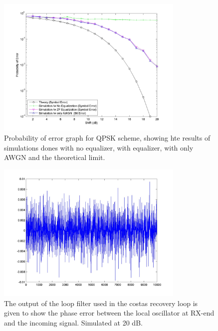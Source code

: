 \documentclass[]{article}
\begin{document}
\begin{figure}[H]
\centering
\includegraphics[width=0.8\textwidth]{qam16SNR.jpg}
\caption{Probability of error graph for QPSK scheme, showing hte results of simulations dones with no equalizer, with equalizer, with only AWGN and the theoretical limit. \label{fig:qamBER}}
\end{figure}

\begin{figure}[H]
\centering
\includegraphics[width=0.8\textwidth]{loop_filter_qam20.jpg}
\caption{The output of the loop filter used in the costas recovery loop is given to show the phase error between the local oscillator at RX-end and the incoming signal. Simulated at 20 dB. \label{fig:qamLoop}}
\end{figure}
\end{document}
